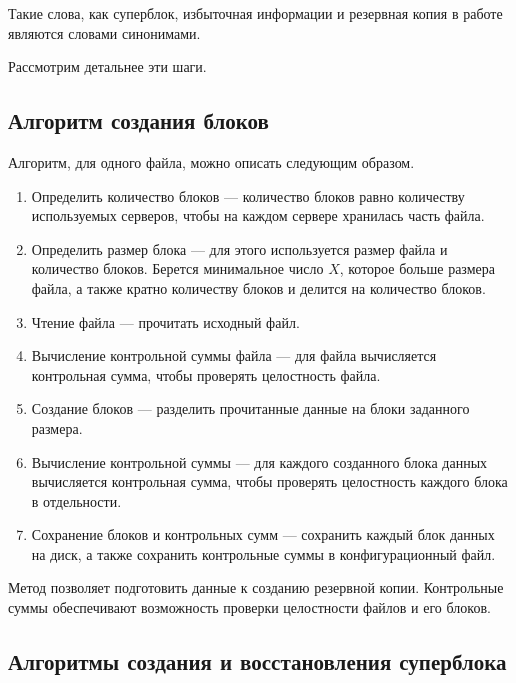Такие слова, как суперблок, избыточная информации и резервная копия в работе являются словами синонимами.  

Рассмотрим детальнее эти шаги.
\newpage
\subsection{Алгоритм создания блоков}

\newpage
\begin{flushleft}
Алгоритм, для одного файла, можно описать следующим образом.
\end{flushleft}

\begin{enumerate}
\item Определить количество блоков --- количество блоков равно количеству используемых серверов, чтобы на каждом сервере хранилась часть файла.

\item Определить размер блока --- для этого используется размер файла и количество блоков. Берется минимальное число $X$, которое больше размера файла, а также кратно количеству блоков и делится на количество блоков.  

\item Чтение файла --- прочитать исходный файл.

\item Вычисление контрольной суммы файла --- для файла вычисляется контрольная сумма, чтобы проверять целостность файла.

\item Создание блоков --- разделить прочитанные данные на блоки заданного размера.

\item Вычисление контрольной суммы --- для каждого созданного блока данных вычисляется контрольная сумма, чтобы проверять целостность каждого блока в отдельности.

\item Сохранение блоков и контрольных сумм --- сохранить каждый блок данных на диск, а также сохранить контрольные суммы в конфигурационный файл.

\end{enumerate}

Метод позволяет подготовить данные к созданию резервной копии. Контрольные суммы обеспечивают возможность проверки целостности файлов и его блоков.

\newpage
\subsection{Алгоритмы создания и восстановления суперблока}

